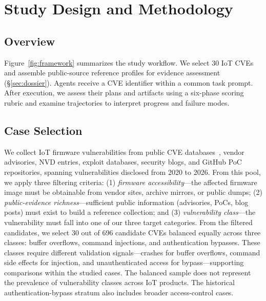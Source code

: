 \section{Study Design and Methodology}



\subsection{Overview}
Figure~\ref{fig:framework} summarizes the study workflow. We select 30 IoT CVEs and assemble public-source reference profiles for evidence assessment (\S\ref{sec:dossier}). Agents receive a CVE identifier within a common task prompt. After execution, we assess their plans and artifacts using a six-phase scoring rubric and examine trajectories to interpret progress and failure modes.



\subsection{Case Selection}
\label{sec:dataset}
We collect IoT firmware vulnerabilities from public CVE databases~\cite{cveorg,cvedetails}, vendor advisories, NVD entries, exploit databases, security blogs, and GitHub PoC repositories, spanning vulnerabilities disclosed from 2020 to 2026. From this pool, we apply three filtering criteria: (1) \emph{firmware accessibility}---the affected firmware image must be obtainable from vendor sites, archive mirrors, or public dumps; (2) \emph{public-evidence richness}---sufficient public information (advisories, PoCs, blog posts) must exist to build a reference collection; and (3) \emph{vulnerability class}---the vulnerability must fall into one of our three target categories. From the filtered candidates, we select 30 out of 696 candidate CVEs balanced equally across three classes: buffer overflows, command injections, and authentication bypasses. These classes require different validation signals---crashes for buffer overflows, command side effects for injection, and unauthenticated access for bypass---supporting comparisons within the studied cases. The balanced sample does not represent the prevalence of vulnerability classes across IoT products. The historical authentication-bypass stratum also includes broader access-control cases.

